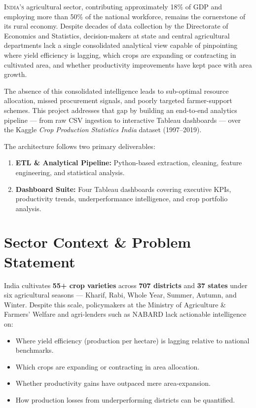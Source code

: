 \documentclass[10pt]{article}
\begin{document}
\noindent
\textsc{India's} agricultural sector, contributing approximately 18\% of GDP and
employing more than 50\% of the national workforce, remains the cornerstone of its
rural economy. Despite decades of data collection by the Directorate of Economics
and Statistics, decision-makers at state and central agricultural departments lack a
single consolidated analytical view capable of pinpointing where yield efficiency is
lagging, which crops are expanding or contracting in cultivated area, and whether
productivity improvements have kept pace with area growth.

The absence of this consolidated intelligence leads to sub-optimal resource
allocation, missed procurement signals, and poorly targeted farmer-support schemes.
This project addresses that gap by building an end-to-end analytics pipeline —
from raw CSV ingestion to interactive Tableau dashboards — over the Kaggle
\textit{Crop Production Statistics India} dataset (1997–2019).

The architecture follows two primary deliverables:
\begin{enumerate}[leftmargin=*, topsep=2pt, itemsep=1pt]
  \item \textbf{ETL \& Analytical Pipeline:} Python-based extraction, cleaning,
        feature engineering, and statistical analysis.
  \item \textbf{Dashboard Suite:} Four Tableau dashboards covering executive KPIs,
        productivity trends, underperformance intelligence, and crop portfolio analysis.
\end{enumerate}

\section{Sector Context \& Problem Statement}

India cultivates \textbf{55+ crop varieties} across \textbf{707 districts} and
\textbf{37 states} under six agricultural seasons — Kharif, Rabi, Whole Year,
Summer, Autumn, and Winter. Despite this scale, policymakers at the Ministry of
Agriculture \& Farmers' Welfare and agri-lenders such as NABARD lack actionable
intelligence on:

\begin{itemize}[leftmargin=*, topsep=2pt, itemsep=1pt]
  \item Where yield efficiency (production per hectare) is lagging relative to
        national benchmarks.
  \item Which crops are expanding or contracting in area allocation.
  \item Whether productivity gains have outpaced mere area-expansion.
  \item How production losses from underperforming districts can be quantified.
\end{itemize}
\end{document}

